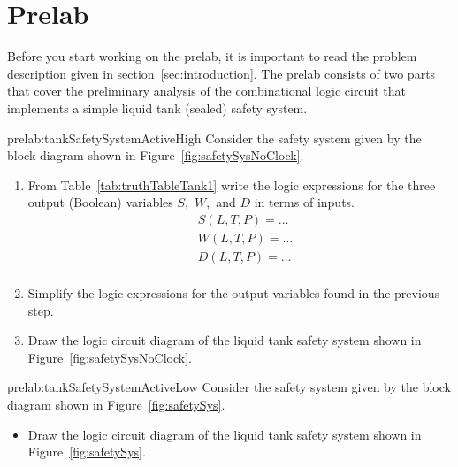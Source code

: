 \section{Prelab}
\label{sec:prelab}
Before you start working on the prelab, it is important to read the problem description given in section~\ref{sec:introduction}.  The prelab consists of two parts that cover the preliminary analysis of the combinational logic circuit that implements a simple liquid tank (sealed) safety system.
%
%
\begin{prelab}{prelab:tankSafetySystemActiveHigh}
  Consider the safety system given by the block diagram shown in Figure~\ref{fig:safetySysNoClock}.
  
  \begin{enumerate}
    \item From Table~\ref{tab:truthTableTank1}  write the logic expressions for the three output (Boolean) variables $S,$ $W,$ and $D$ in terms of inputs.
  \begin{align*}
    &S(L,T,P) = \ldots \\
    &W(L,T,P) = \ldots \\
    &D(L,T,P) = \ldots \\    
  \end{align*}

\item Simplify the logic expressions for the output variables found in the previous step. %
\item  Draw the logic circuit diagram of the liquid tank safety system shown in Figure~\ref{fig:safetySysNoClock}.
\end{enumerate}
\end{prelab}

\begin{prelab}{prelab:tankSafetySystemActiveLow}
Consider the safety system given by the block diagram shown in Figure~\ref{fig:safetySys}. 
%
\begin{itemize}  
\item  Draw the logic circuit diagram of the liquid tank safety system shown in Figure~\ref{fig:safetySys}.
\end{itemize}
\end{prelab}


